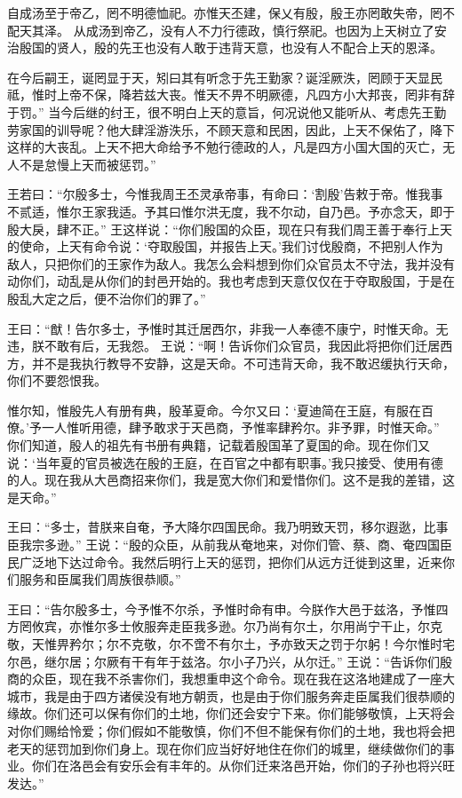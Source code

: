 \documentclass[a4paper,12pt,UTF8,twoside]{ctexbook}
\begin{document}
自成汤至于帝乙，罔不明德恤祀。亦惟天丕建，保乂有殷，殷王亦罔敢失帝，罔不配天其泽。
从成汤到帝乙，没有人不力行德政，慎行祭祀。也因为上天树立了安治殷国的贤人，殷的先王也没有人敢于违背天意，也没有人不配合上天的恩泽。

在今后嗣王，诞罔显于天，矧曰其有听念于先王勤家？诞淫厥泆，罔顾于天显民祗，惟时上帝不保，降若兹大丧。惟天不畀不明厥德，凡四方小大邦丧，罔非有辞于罚。”
当今后继的纣王，很不明白上天的意旨，何况说他又能听从、考虑先王勤劳家国的训导呢？他大肆淫游泆乐，不顾天意和民困，因此，上天不保佑了，降下这样的大丧乱。上天不把大命给予不勉行德政的人，凡是四方小国大国的灭亡，无人不是怠慢上天而被惩罚。”

王若曰：“尔殷多士，今惟我周王丕灵承帝事，有命曰：‘割殷’告敕于帝。惟我事不贰适，惟尔王家我适。予其曰惟尔洪无度，我不尔动，自乃邑。予亦念天，即于殷大戾，肆不正。”
王这样说：“你们殷国的众臣，现在只有我们周王善于奉行上天的使命，上天有命令说：‘夺取殷国，并报告上天。’我们讨伐殷商，不把别人作为敌人，只把你们的王家作为敌人。我怎么会料想到你们众官员太不守法，我并没有动你们，动乱是从你们的封邑开始的。我也考虑到天意仅仅在于夺取殷国，于是在殷乱大定之后，便不治你们的罪了。”

王曰：“猷！告尔多士，予惟时其迁居西尔，非我一人奉德不康宁，时惟天命。无违，朕不敢有后，无我怨。
王说：“啊！告诉你们众官员，我因此将把你们迁居西方，并不是我执行教导不安静，这是天命。不可违背天命，我不敢迟缓执行天命，你们不要怨恨我。

惟尔知，惟殷先人有册有典，殷革夏命。今尔又曰：‘夏迪简在王庭，有服在百僚。’予一人惟听用德，肆予敢求于天邑商，予惟率肆矜尔。非予罪，时惟天命。”
你们知道，殷人的祖先有书册有典籍，记载着殷国革了夏国的命。现在你们又说：‘当年夏的官员被选在殷的王庭，在百官之中都有职事。’我只接受、使用有德的人。现在我从大邑商招来你们，我是宽大你们和爱惜你们。这不是我的差错，这是天命。”

王曰：“多士，昔朕来自奄，予大降尔四国民命。我乃明致天罚，移尔遐逖，比事臣我宗多逊。”
王说：“殷的众臣，从前我从奄地来，对你们管、蔡、商、奄四国臣民广泛地下达过命令。我然后明行上天的惩罚，把你们从远方迁徙到这里，近来你们服务和臣属我们周族很恭顺。”

王曰：“告尔殷多士，今予惟不尔杀，予惟时命有申。今朕作大邑于兹洛，予惟四方罔攸宾，亦惟尔多士攸服奔走臣我多逊。尔乃尚有尔土，尔用尚宁干止，尔克敬，天惟畀矜尔；尔不克敬，尔不啻不有尔土，予亦致天之罚于尔躬！今尔惟时宅尔邑，继尔居；尔厥有干有年于兹洛。尔小子乃兴，从尔迁。”
王说：“告诉你们殷商的众臣，现在我不杀害你们，我想重申这个命令。现在我在这洛地建成了一座大城市，我是由于四方诸侯没有地方朝贡，也是由于你们服务奔走臣属我们很恭顺的缘故。你们还可以保有你们的土地，你们还会安宁下来。你们能够敬慎，上天将会对你们赐给怜爱；你们假如不能敬慎，你们不但不能保有你们的土地，我也将会把老天的惩罚加到你们身上。现在你们应当好好地住在你们的城里，继续做你们的事业。你们在洛邑会有安乐会有丰年的。从你们迁来洛邑开始，你们的子孙也将兴旺发达。”
\end{document}
